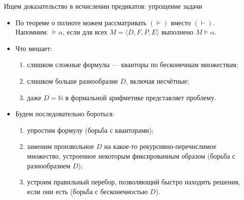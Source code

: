 \documentclass[handout]{beamer}
\begin{document}
\begin{frame}{Ищем доказательство в исчислении предикатов: упрощение задачи}

\begin{itemize}
\item По теореме о полноте можем рассматривать $(\models)$ вместо $(\vdash)$. 
Напомним: $\models \alpha$, если для всех $M = \langle D, F, P, E \rangle$ выполнено $M \models \alpha$.\pause
\vspace{0.3cm}

\item Что мешает:
\begin{enumerate}
\item слишком сложные формулы --- кванторы по бесконечным множествам;
\item слишком больше разнообразие $D$, включая несчётные;
\item даже $D = \mathbb{N}$ в формальной арифметике представляет проблему.
\end{enumerate}\pause
\vspace{0.3cm}

\item Будем последовательно бороться:
\begin{enumerate}
\item упростим формулу (борьба с кванторами);
\item заменим произвольное $D$ на какое-то рекурсивно-перечислимое множество, устроенное некоторым фиксированным образом (борьба с разнообразием $D$);
\item устроим правильный перебор, позволяющий быстро находить решения, если они есть (борьба с бесконечностью $D$).
\end{enumerate}
\end{itemize}
\end{frame}
\end{document}
